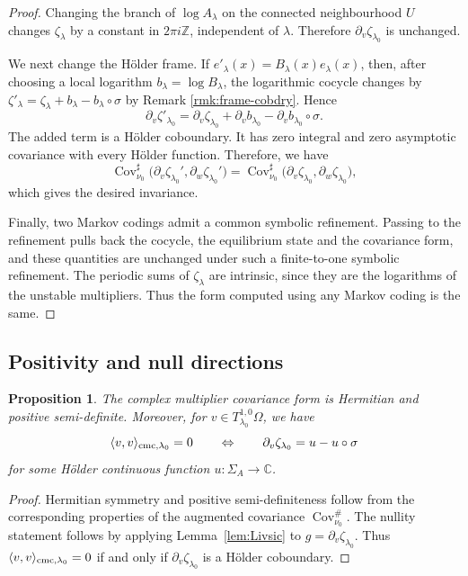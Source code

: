 \documentclass[11pt]{amsart}
\theoremstyle{plain}
\newtheorem{prop}[thm]{Proposition}
\theoremstyle{definition}
\theoremstyle{remark}
\begin{document}
\begin{proof}
Changing the branch of $\log A_\lambda$ on the connected
neighbourhood $U$ changes $\zeta_\lambda$ by a constant in
$2\pi i\mathbb Z$, independent of $\lambda$. Therefore
$\partial_v\zeta_{\lambda_0}$ is unchanged.

We next change the Hölder frame. If
$e'_\lambda(x)=B_\lambda(x)e_\lambda(x)$, then, after choosing a local
logarithm $b_\lambda=\log B_\lambda$, the logarithmic cocycle changes
by
$\zeta'_\lambda
= \zeta_\lambda+b_\lambda-b_\lambda\circ\sigma$ by Remark \ref{rmk:frame-cobdry}.
Hence
$$
\partial_v\zeta'_{\lambda_0}
= \partial_v\zeta_{\lambda_0}
  +\partial_v b_{\lambda_0}
  -\partial_v b_{\lambda_0}\circ\sigma .
$$
The added term is a Hölder coboundary. It has zero integral and zero
asymptotic covariance with every Hölder function. Therefore, we have
$$
\operatorname{Cov}^{\sharp}_{\nu_0}
\bigl(\partial_v\zeta_{\lambda_0}',
\partial_w\zeta_{\lambda_0}'\bigr)
=
\operatorname{Cov}^{\sharp}_{\nu_0}
\bigl(\partial_v\zeta_{\lambda_0},
\partial_w\zeta_{\lambda_0}\bigr),$$
which gives the desired invariance.

Finally, two Markov codings admit a common symbolic refinement. Passing
to the refinement pulls back the cocycle, the equilibrium state and the
covariance form, and these quantities are unchanged under such a
finite-to-one symbolic refinement. The periodic sums of
$\zeta_\lambda$ are intrinsic, since they are the logarithms of the
unstable multipliers. Thus the form computed using any Markov coding is
the same.
\end{proof}


\subsection{Positivity and null directions}
\begin{prop}\label{p:pos-null}
The complex multiplier covariance form is Hermitian and positive
semi-definite. Moreover, for $v\in T^{1,0}_{\lambda_0}\Omega$, we have
$$
  \langle v,v\rangle_{{\rm cmc},\lambda_0}=0
\qquad \Leftrightarrow
\qquad 
\partial_v\zeta_{\lambda_0}
  =
  u-u\circ\sigma$$
for some
H\"older continuous
function $u
\colon \Sigma_A\to\mathbb C$.
\end{prop}

\begin{proof}
Hermitian symmetry and positive semi-definiteness follow from the
corresponding properties of the augmented covariance
$\operatorname{Cov}^{\#}_{\nu_0}$.
The nullity statement follows by applying
Lemma~\ref{lem:Livsic} 
to
$g=\partial_v\zeta_{\lambda_0}$. Thus
$\langle v,v\rangle_{{\rm cmc},\lambda_0}=0$ if and only if
$\partial_v\zeta_{\lambda_0}$ is a H\"older coboundary. 
\end{proof}
\end{document}
